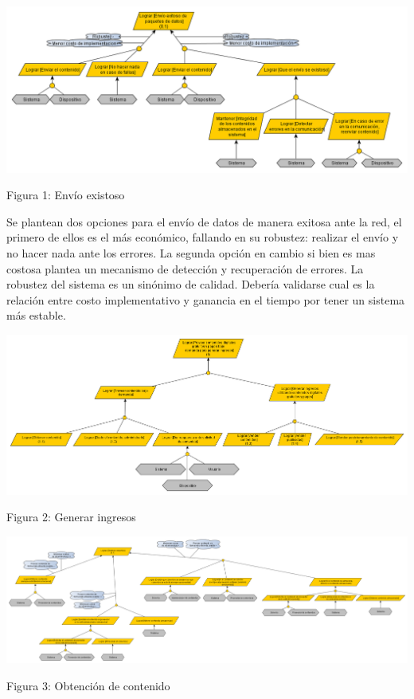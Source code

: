 \documentclass[11pt, a4paper, spanish]{article}
\begin{document}
\newpage
	\begin{center}
		\includegraphics[scale=0.60, angle=90]{Diagramas/0-1ModelodeObjetivosEnvioexitoso.png}
	\end{center}
	\begin{center}
		\small{Figura 1: Env\'io existoso}
	\end{center}
	Se plantean dos opciones para el env\'io de datos de manera exitosa ante la red, el primero de ellos es el m\'as econ\'omico, fallando en su robustez: realizar el env\'io y no hacer nada ante los errores. La segunda opci\'on en cambio si bien es mas costosa plantea un mecanismo de detecci\'on y recuperaci\'on de errores. La robustez del sistema es un sin\'onimo de calidad. Deber\'ia validarse cual es la relaci\'on entre costo implementativo y ganancia en el tiempo por tener un sistema m\'as estable.

\newpage
	\begin{center}
		\includegraphics[scale=0.45, angle=90]{Diagramas/1ModelodeObjetivosGenerarIngresos.png}
	\end{center}
	\begin{center}
		\small{Figura 2: Generar ingresos}
	\end{center}
\newpage
	\begin{center}
		\includegraphics[scale=0.28, angle=90]{Diagramas/1-1ModelodeObjetivosObtenercontenido.png}
	\end{center}
	\begin{center}
		\small{Figura 3: Obtenci\'on de contenido}
	\end{center}
\end{document}
